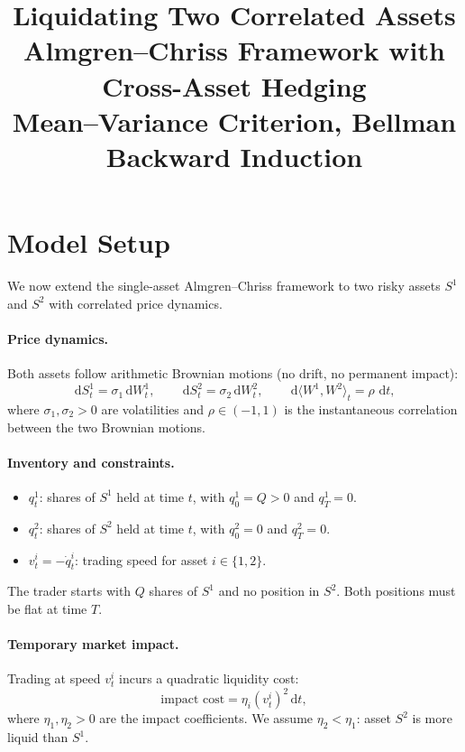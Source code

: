 \documentclass[12pt, a4paper]{article}
\title{%
  \textbf{\textcolor{accentblue}{Liquidating Two Correlated Assets}}\\[4pt]
  \large Almgren--Chriss Framework with Cross-Asset Hedging\\
  \normalsize Mean--Variance Criterion, Bellman Backward Induction\\[6pt]
}
\author{}
\date{}
\newcommand{\dd}{\,\mathrm{d}}
\begin{document}
\maketitle
\thispagestyle{empty}

\section{Model Setup}

We now extend the single-asset Almgren--Chriss framework to two risky assets
$S^1$ and $S^2$ with correlated price dynamics.

\paragraph{Price dynamics.}
Both assets follow arithmetic Brownian motions (no drift, no permanent impact):
\[
  \dd S^1_t = \sigma_1 \dd W^1_t,
  \qquad
  \dd S^2_t = \sigma_2 \dd W^2_t,
  \qquad
  \dd\langle W^1, W^2\rangle_t = \rho\,\dd t,
\]
where $\sigma_1, \sigma_2 > 0$ are volatilities and $\rho \in (-1,1)$ is the
instantaneous correlation between the two Brownian motions.

\paragraph{Inventory and constraints.}
\begin{itemize}[leftmargin=1.5em]
  \item $q^1_t$: shares of $S^1$ held at time $t$, with $q^1_0 = Q > 0$ and $q^1_T = 0$.
  \item $q^2_t$: shares of $S^2$ held at time $t$, with $q^2_0 = 0$ and $q^2_T = 0$.
  \item $v^i_t = -\dot{q}^i_t$: trading speed for asset $i \in \{1,2\}$.
\end{itemize}
The trader starts with $Q$ shares of $S^1$ and no position in $S^2$.
Both positions must be flat at time $T$.

\paragraph{Temporary market impact.}
Trading at speed $v^i_t$ incurs a quadratic liquidity cost:
\[
  \text{impact cost} = \eta_i (v^i_t)^2 \dd t,
\]
where $\eta_1, \eta_2 > 0$ are the impact coefficients.
We assume $\eta_2 < \eta_1$: asset $S^2$ is more liquid than $S^1$.
\end{document}
